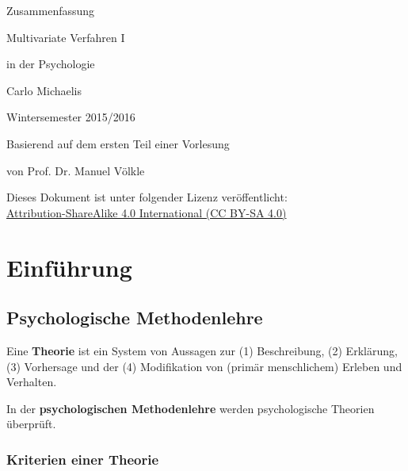 \documentclass{article}
\numberwithin{equation}{section}
\begin{document}
\begin{center}

\thispagestyle{empty}

\vspace*{4cm}

\LARGE Zusammenfassung

\Huge Multivariate Verfahren I

\Large in der Psychologie

\vspace*{8cm}

\large Carlo Michaelis

\large Wintersemester 2015/2016

\vspace*{0.3cm}

\normalsize Basierend auf dem ersten Teil einer Vorlesung

\normalsize von Prof. Dr. Manuel Völkle

\vfill

\normalsize{Dieses Dokument ist unter folgender Lizenz veröffentlicht:\\ \href{http://creativecommons.org/licenses/by-sa/4.0/}{Attribution-ShareAlike 4.0 International (CC BY-SA 4.0)}}


\end{center}

\newpage

\tableofcontents

\newpage


\section{Einführung}

\subsection{Psychologische Methodenlehre}

Eine \textbf{Theorie} ist ein System von Aussagen zur (1) Beschreibung, (2) Erklärung, (3) Vorhersage und der (4) Modifikation von (primär menschlichem) Erleben und Verhalten.

In der \textbf{psychologischen Methodenlehre} werden psychologische Theorien überprüft.

\subsubsection{Kriterien einer Theorie}
\end{document}
